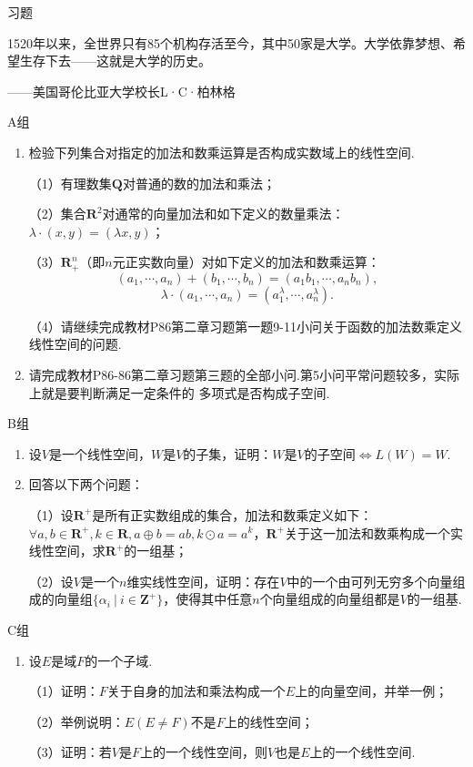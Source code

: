 \centerline{\heiti \Large 习题}
\vspace{2ex} 
{\kaishu 1520年以来，全世界只有85个机构存活至今，其中50家是大学。大学依靠梦想、希望生存下去——这就是大学的历史。}
\begin{flushright}
    \kaishu
    ——美国哥伦比亚大学校长L·C·柏林格
\end{flushright}
\centerline{\heiti A组}
\begin{enumerate}
	\item 检验下列集合对指定的加法和数乘运算是否构成实数域上的线性空间.
	
	（1）有理数集$\mathbf{Q}$对普通的数的加法和乘法；

	（2）集合$\mathbf{R}^2$对通常的向量加法和如下定义的数量乘法：$\lambda\cdot(x,y)=(\lambda x,y)$；

	（3）$\mathbf{R}_+^n$（即$n$元正实数向量）对如下定义的加法和数乘运算：
	$$(a_1,\cdots,a_n)+(b_1,\cdots,b_n)=(a_1b_1,\cdots,a_nb_n),$$
	$$\lambda\cdot(a_1,\cdots,a_n)=(a_1^\lambda,\cdots,a_n^\lambda).$$

	（4）请继续完成教材P86第二章习题第一题9-11小问关于函数的加法数乘定义线性空间的问题.
	\item 请完成教材P86-86第二章习题第三题的全部小问.第5小问平常问题较多，实际上就是要判断满足一定条件的
	多项式是否构成子空间.
\end{enumerate}
\centerline{\heiti B组}
\begin{enumerate}
	\item 设$V$是一个线性空间，$W$是$V$的子集，证明：$W$是$V$的子空间$\iff L(W)=W$.
	\item 回答以下两个问题：

	（1）设$\mathbf{R}^+$是所有正实数组成的集合，加法和数乘定义如下：$\forall a,b \in \mathbf{R}^+,k\in \mathbf{R},a\oplus b = ab, k\odot a = a^k$，$\mathbf{R}^+$关于这一加法和数乘构成一个实线性空间，求$\mathbf{R}^+$的一组基；

	（2）设$V$是一个$n$维实线性空间，证明：存在$V$中的一个由可列无穷多个向量组成的向量组$\{\alpha_i\ |\ i\in\mathbf{Z}^+\}$，使得其中任意$n$个向量组成的向量组都是$V$的一组基.
\end{enumerate}
\centerline{\heiti C组}
\begin{enumerate}
	\item 设$E$是域$F$的一个子域.
	
	（1）证明：$F$关于自身的加法和乘法构成一个$E$上的向量空间，并举一例；

	（2）举例说明：$E(E\neq F)$不是$F$上的线性空间；

	（3）证明：若$V$是$F$上的一个线性空间，则$V$也是$E$上的一个线性空间.
\end{enumerate}